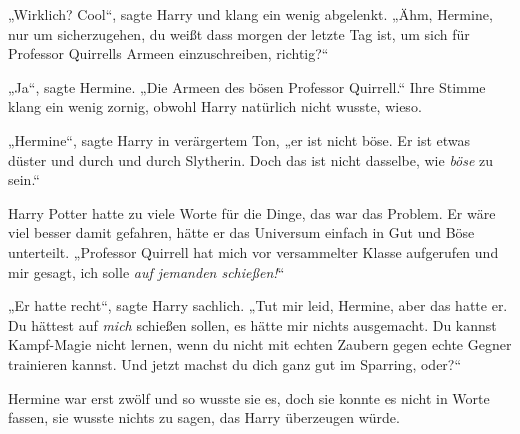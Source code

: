 „Wirklich? Cool“, sagte Harry und klang ein wenig abgelenkt. „Ähm, Hermine, nur um sicherzugehen, du weißt dass morgen der letzte Tag ist, um sich für Professor Quirrells Armeen einzuschreiben, richtig?“

„Ja“, sagte Hermine. „Die Armeen des bösen Professor Quirrell.“ Ihre Stimme klang ein wenig zornig, obwohl Harry natürlich nicht wusste, wieso.

„Hermine“, sagte Harry in verärgertem Ton, „er ist nicht böse. Er ist etwas düster und durch und durch Slytherin. Doch das ist nicht dasselbe, wie \emph{böse} zu sein.“

Harry Potter hatte zu viele Worte für die Dinge, das war das Problem. Er wäre viel besser damit gefahren, hätte er das Universum einfach in Gut und Böse unterteilt. „Professor Quirrell hat mich vor versammelter Klasse aufgerufen und mir gesagt, ich solle \emph{auf jemanden schießen!}“

„Er hatte recht“, sagte Harry sachlich. „Tut mir leid, Hermine, aber das hatte er. Du hättest auf \emph{mich} schießen sollen, es hätte mir nichts ausgemacht. Du kannst Kampf-Magie nicht lernen, wenn du nicht mit echten Zaubern gegen echte Gegner trainieren kannst. Und jetzt machst du dich ganz gut im Sparring, oder?“

Hermine war erst zwölf und so wusste sie es, doch sie konnte es nicht in Worte fassen, sie wusste nichts zu sagen, das Harry überzeugen würde.

